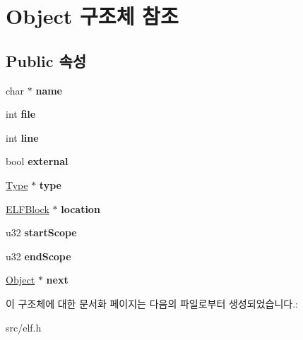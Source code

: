 \hypertarget{struct_object}{}\section{Object 구조체 참조}
\label{struct_object}
\subsection*{Public 속성}
\begin{DoxyCompactItemize}
\item 
\mbox{\label{struct_object_a1792dbef505e3bb7eab133117b431010}} 
char $\ast$ {\bfseries name}
\item 
\mbox{\label{struct_object_a378b52bc4620a2ec9df0f0d3d0a1b48a}} 
int {\bfseries file}
\item 
\mbox{\label{struct_object_aa3f350a46fefbb0a82c0a00dede2294a}} 
int {\bfseries line}
\item 
\mbox{\label{struct_object_add5f5917bb52d63d6b80e56c8f48ba59}} 
bool {\bfseries external}
\item 
\mbox{\label{struct_object_ae0e4e287e6fcefa00b8ae4e4c127ffa9}} 
\mbox{\hyperlink{struct_type}{Type}} $\ast$ {\bfseries type}
\item 
\mbox{\label{struct_object_ad1adf7cf51dfe7a95d2802696f93bd0f}} 
\mbox{\hyperlink{struct_e_l_f_block}{E\+L\+F\+Block}} $\ast$ {\bfseries location}
\item 
\mbox{\label{struct_object_a15512a3ed1b2415c37a5d240a215cbb4}} 
u32 {\bfseries start\+Scope}
\item 
\mbox{\label{struct_object_a897fd61737cc389e4660eb6df0f54a4f}} 
u32 {\bfseries end\+Scope}
\item 
\mbox{\label{struct_object_a29524055e3b5fe5df2e3c41fa81ff1ff}} 
\mbox{\hyperlink{struct_object}{Object}} $\ast$ {\bfseries next}
\end{DoxyCompactItemize}


이 구조체에 대한 문서화 페이지는 다음의 파일로부터 생성되었습니다.\+:\begin{DoxyCompactItemize}
\item 
src/elf.\+h\end{DoxyCompactItemize}
